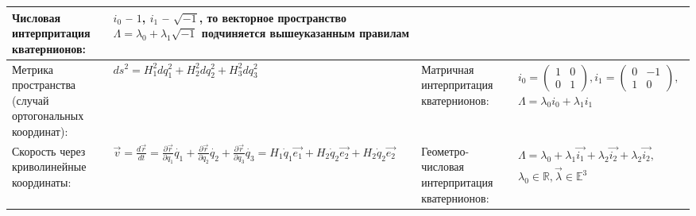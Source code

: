 \documentclass{article}
\begin{document}
\begin{tabular}{ |p{3.8cm}|p{5.7cm}|p{3.8cm}|p{5.7cm}|  }
Числовая интерпритация кватернионов:                                         &  %
$i_0$ -- $1$, $i_1$ -- $\sqrt{-1}$, то векторное пространство
$\Lambda = \lambda_0 + \lambda_1 \sqrt{-1}$ подчиняется вышеуказанным
правилам                                                                     \\ %
\hline
Метрика пространства (случай ортогональных координат):                       &  %
$ds^2 = H_1^2 d q_1^2 + H_2^2 d q_2^2 + H_3^2 d q_3^2$                       &  %
Матричная интерпритация кватернионов:                                        &  %
$\begin{aligned}
i_0 =
\left(\begin{array}{cc}
1 & 0 \\
0 & 1
\end{array}\right),
i_1 =
\left(\begin{array}{cc}
0 & -1 \\
1 & 0
\end{array}\right),      \\
\Lambda = \lambda_0 i_0 + \lambda_1 i_1
\end{aligned}$
                               \\ %
\hline
Скорость через криволинейные координаты:                                     &  %
$\vec{v} = \frac{d\vec{r}}{dt} =
 \frac{\partial \vec{r}}{\partial q_1} \dot{q_1} +
 \frac{\partial \vec{r}}{\partial q_2} \dot{q_2} +
 \frac{\partial \vec{r}}{\partial q_3} \dot{q_3} =
H_1 \dot q_1 \vec{e_1} + H_2 \dot q_2 \vec{e_2} + H_2 \dot q_2 \vec{e_2}$    &  %
Геометро-числовая интерпритация кватернионов:                                &  %
$\begin{aligned}
\Lambda = \lambda_0 + \lambda_1 \vec{i_1} +
 \lambda_2 \vec{i_2} + \lambda_2 \vec{i_2},         \\
\lambda_0 \in \mathbb{R}, \vec{\lambda} \in \mathbb{E}^3
\end{aligned}$                                                                \\ %
\hline
\end{tabular}

\newpage
\end{document}
